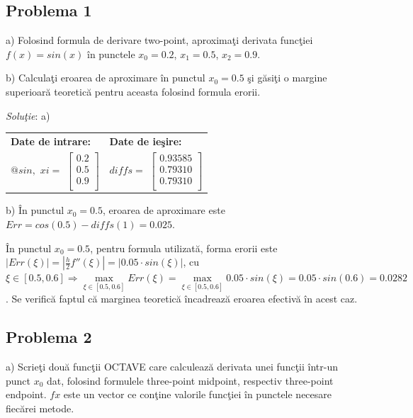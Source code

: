 \documentclass{exam}
\newcommand{\octavescript}[2]{
	
}
\begin{document}
\subsection{Problema 1}
a) Folosind formula de derivare two-point, aproxima\c{t}i derivata func\c{t}iei $f(x)=sin(x)$ \^{i}n punctele $x_0=0.2$, $x_1=0.5$, $x_2=0.9$.

b) Calcula\c{t}i eroarea de aproximare \^{i}n punctul $x_{0} = 0.5$ \c{s}i g\u{a}si\c{t}i o margine superioar\u{a} teoretic\u{a} pentru aceasta folosind formula erorii.

\textit{Solu\c{t}ie}: a)

\octavescript{./src/lab11Pr1.m}{Metoda de derivare two-point.}

\begin{center}
	\begin{tabular}{| l | l |}
		\hline
		\textbf{Date de intrare:} & \textbf{Date de ieşire:} \\
		$@sin,$
		$xi = $
		$
			\begin{bmatrix}
				0.2 \\
				0.5 \\
				0.9 \\
			\end{bmatrix}
		$
		                          &
		$diffs = $
		$
			\begin{bmatrix}
				0.93585 \\
				0.79310 \\
				0.79310 \\
			\end{bmatrix}
		$
		\\
		\hline
	\end{tabular}
\end{center}

b)
\^{I}n punctul $x_0=0.5$, eroarea de aproximare este $Err=cos(0.5)-diffs(1) = 0.025$.

\^{I}n punctul $x_0=0.5$, pentru formula utilizat\u{a}, forma erorii este $\left|Err(\xi)\right| = \left|\frac{h}{2}f''(\xi)\right|=\left|0.05\cdot sin(\xi)\right|$, cu $\xi\in\left[0.5,0.6\right]\Rightarrow \max\limits_{\xi\in\left[0.5,0.6\right]}Err(\xi)=\max\limits_{\xi\in\left[0.5,0.6\right]}0.05\cdot sin(\xi)=0.05\cdot sin(0.6)=0.0282$. Se verific\u{a} faptul c\u{a} marginea teoretic\u{a} \^{i}ncadreaz\u{a} eroarea efectiv\u{a} \^{i}n acest caz.


\subsection{Problema 2}
a) Scrie\c{t}i dou\u{a} func\c{t}ii OCTAVE care calculeaz\u{a} derivata unei func\c{t}ii \^{i}ntr-un punct $x_0$ dat, folosind formulele three-point midpoint, respectiv three-point endpoint. $fx$ este un vector ce con\c{t}ine valorile func\c{t}iei  \^{i}n punctele necesare fiec\u{a}rei metode.
\end{document}
